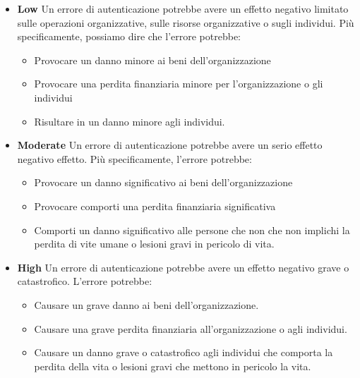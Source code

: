 \begin{itemize}

    \item \textbf{Low} Un errore di autenticazione potrebbe avere un effetto negativo limitato sulle operazioni organizzative, sulle risorse organizzative o sugli individui. Più specificamente, possiamo dire che l'errore potrebbe:
    
    \begin{itemize}
        
        \item Provocare un danno minore ai beni dell'organizzazione
        
        \item Provocare una perdita finanziaria minore per l'organizzazione o gli individui
        
        \item Risultare in un danno minore agli individui.
    \end{itemize}
    
    \item \textbf{Moderate} Un errore di autenticazione potrebbe avere un serio effetto negativo effetto. Più specificamente, l'errore potrebbe:
    
    \begin{itemize}
        \item Provocare un danno significativo ai beni dell'organizzazione
        
        \item Provocare comporti una perdita finanziaria significativa
        
        \item Comporti un danno significativo alle persone che non che non implichi la perdita di vite umane o lesioni gravi in pericolo di vita.
    \end{itemize}
    
    \item \textbf{High}
    Un errore di autenticazione potrebbe avere un effetto negativo grave o catastrofico. L'errore potrebbe:
    
    \begin{itemize}
        
        \item Causare un grave danno ai beni dell'organizzazione.
        
        \item Causare una grave perdita finanziaria all'organizzazione o agli individui.
        
        \item Causare un danno grave o catastrofico agli individui che comporta la perdita della vita o lesioni gravi che mettono in pericolo la vita.
    \end{itemize}

\end{itemize}
